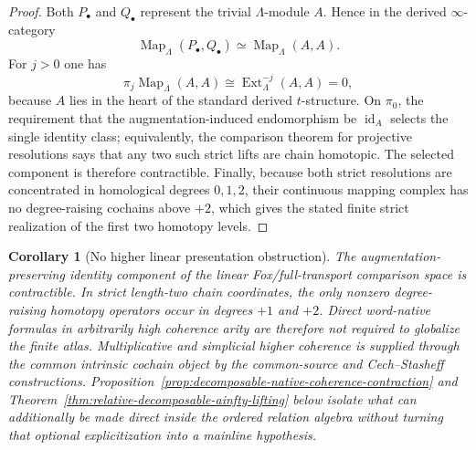 \documentclass[11pt]{article}
\newtheorem{corollary}[theorem]{Corollary}
\theoremstyle{definition}
\begin{document}
\begin{proof}
Both $P_\bullet$ and $Q_\bullet$ represent the trivial $\Lambda$-module $A$.
Hence in the derived $\infty$-category
\[
 \operatorname{Map}_{\Lambda}(P_\bullet,Q_\bullet)
 \simeq
 \operatorname{Map}_{\Lambda}(A,A).
\]
For $j>0$ one has
\[
 \pi_j\operatorname{Map}_{\Lambda}(A,A)
 \cong
 \operatorname{Ext}^{-j}_{\Lambda}(A,A)=0,
\]
because $A$ lies in the heart of the standard derived $t$-structure.  On
$\pi_0$, the requirement that the augmentation-induced endomorphism be
$\operatorname{id}_A$ selects the single identity class; equivalently, the
comparison theorem for projective resolutions says that any two such strict
lifts are chain homotopic.  The selected component is therefore contractible.
Finally, because both strict resolutions are concentrated in homological degrees
$0,1,2$, their continuous mapping complex has no degree-raising cochains above
$+2$, which gives the stated finite strict realization of the first two homotopy
levels.
\end{proof}

\begin{corollary}[No higher linear presentation obstruction]\label{cor:no-higher-linear-presentation-obstruction}
The augmentation-preserving identity component of the linear Fox/full-transport comparison space is contractible.  In strict length-two chain coordinates, the only nonzero degree-raising homotopy operators occur in degrees $+1$ and $+2$.  Direct word-native formulas in arbitrarily high coherence arity are therefore not required to globalize the finite atlas.  Multiplicative and simplicial higher coherence is supplied through the common intrinsic cochain object by the common-source and Cech--Stasheff constructions.  Proposition~\ref{prop:decomposable-native-coherence-contraction} and Theorem~\ref{thm:relative-decomposable-ainfty-lifting} below isolate what can additionally be made direct inside the ordered relation algebra without turning that optional explicitization into a mainline hypothesis.
\end{corollary}
\end{document}
